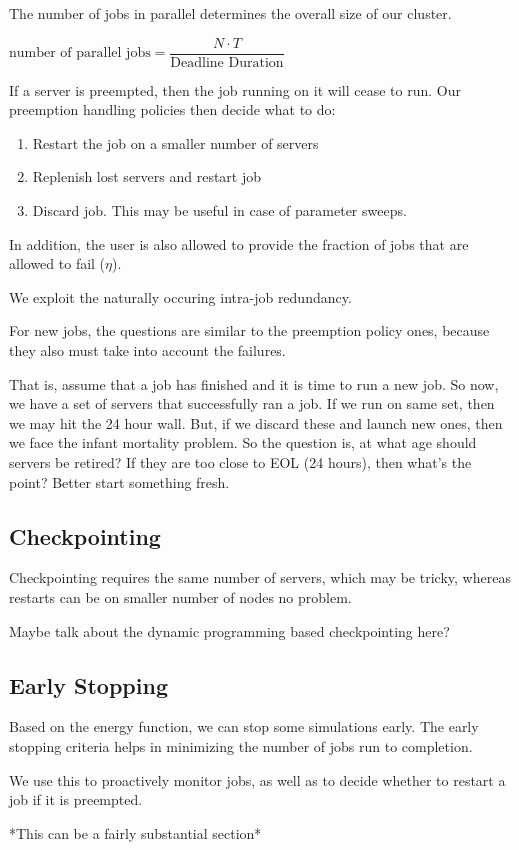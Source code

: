 The number of jobs in parallel determines the overall size of our cluster.

$\text{number of parallel jobs} = \dfrac{N\cdot T}{\text{Deadline Duration}}$

If a server is preempted, then the job running on it will cease to run.
Our preemption handling policies then decide what to do:
\begin{enumerate}
\item Restart the job on a smaller number of servers 
\item Replenish lost servers and restart job
\item Discard job. This may be useful in case of parameter sweeps. 
\end{enumerate}

In addition, the user is also allowed to provide the fraction of jobs that are allowed to fail ($\eta$).

We exploit the naturally occuring intra-job redundancy. 

For new jobs, the questions are similar to the preemption policy ones, because they also must take into account the failures.

That is, assume that a job has finished and it is time to run a new job. So now, we have a set of servers that successfully ran a job. If we run on same set, then we may hit the 24 hour wall. But, if we discard these and launch new ones, then we face the infant mortality problem. So the question is, at what age should servers be retired? If they are too close to EOL (24 hours), then what's the point? Better start something fresh.



\subsection{Checkpointing}

Checkpointing requires the same number of servers, which may be tricky, whereas restarts can be on smaller number of nodes no problem.

Maybe talk about the dynamic programming based checkpointing here?



\subsection{Early Stopping}

Based on the energy function, we can stop some simulations early.
The early stopping criteria helps in minimizing the number of jobs run to completion.

We use this to proactively monitor jobs, as well as to decide whether to restart a job if it is preempted.

*This can be a fairly substantial section*



